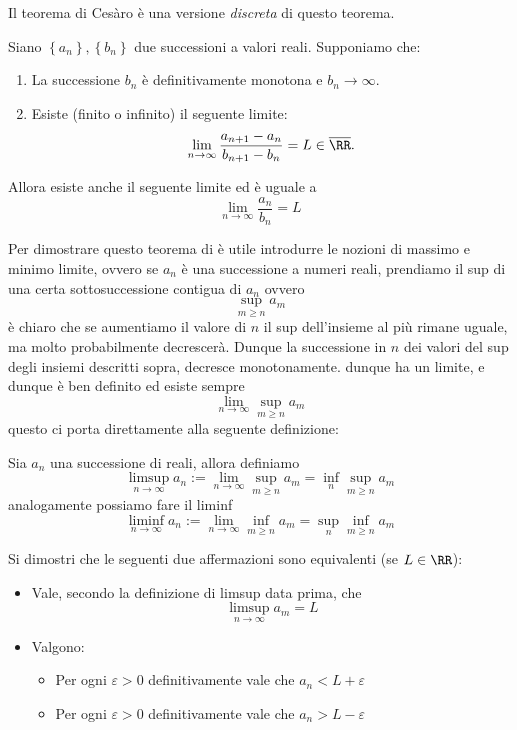 \documentclass[11pt]{scrartcl}
\begin{document}
  	Il teorema di Cesàro è una versione \textit{discreta} di questo teorema. 
  \begin{theorem}[Cesàro]
  	Siano $\left\{a_n\right\},\left\{b_n\right\}$ due successioni a valori reali. Supponiamo che: 
  	\begin{enumerate}
  		\item[1)] La successione $b_n$ è definitivamente monotona e $b_n\to\infty$.
  		\item[2)] Esiste (finito o infinito) il seguente limite: 
  		$$\lim_{n\to\infty}\frac{a_{n+1}-a_n}{b_{n+1}-b_n}=L\in\overline{\RR}.$$ 
  	\end{enumerate}
  	Allora esiste anche il seguente limite ed è uguale a 
  	$$\lim_{n\to\infty}\frac{a_n}{b_n}=L$$
  \end{theorem}
  Per dimostrare questo teorema di è utile introdurre le nozioni di massimo e minimo limite, ovvero se $a_n$ è una successione a numeri reali, prendiamo il sup di una certa sottosuccessione contigua di $a_n$ ovvero
  $$\sup_{m\ge n}a_m$$
  è chiaro che se aumentiamo il valore di $n$ il sup dell'insieme al più rimane uguale, ma molto probabilmente decrescerà. Dunque la successione in $n$ dei valori del sup degli insiemi descritti sopra, decresce monotonamente. dunque ha un limite, e dunque è ben definito ed esiste sempre
  $$\lim_{n\to\infty}\sup_{m\ge n} a_m$$
  questo ci porta direttamente alla seguente definizione:
  \begin{definition}
  	Sia $a_n$ una successione di reali, allora definiamo
  	$$\limsup_{n\to\infty}a_n:=\lim_{n\to\infty}\sup_{m\ge n} a_m=\inf_n\sup_{m\ge n}a_m$$
  	analogamente possiamo fare il liminf
  	$$\liminf_{n\to\infty}a_n:=\lim_{n\to\infty}\inf_{m\ge n} a_m=\sup_n\inf_{m\ge n}a_m$$
  \end{definition}
  \begin{exercise}
  	Si dimostri che le seguenti due affermazioni sono equivalenti (se $L\in\RR$):
  	\begin{itemize}
  		\item Vale, secondo la definizione di limsup data prima, che
  		$$\limsup_{n\to\infty}a_m=L$$
  		\item Valgono:
  		\begin{itemize}
  			\item Per ogni $\varepsilon>0$ definitivamente vale che $a_n<L+\varepsilon$
  			\item Per ogni $\varepsilon>0$ definitivamente vale che $a_n>L-\varepsilon$
  		\end{itemize}
  	\end{itemize}
  \end{exercise}
\end{document}
